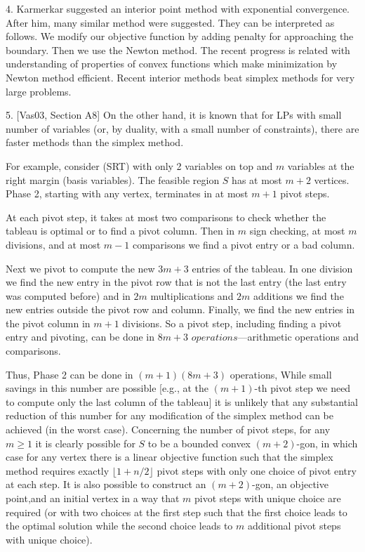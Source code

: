 4. Karmerkar suggested  an interior point  method   with exponential convergence.
After him, many similar method were suggested. They can be interpreted as follows.
We modify our objective function by adding penalty for approaching the boundary.
Then we use the Newton method. The recent progress is related with  understanding of   properties of convex functions which make minimization by Newton method efficient.
  Recent interior methods   beat simplex methods for very large problems. 

5. [Vas03, Section A8] On the other hand,  it is known that for LPs with small number of variables (or, by duality, with a small number of constraints), there are faster methods than the simplex method. 

For example, consider (SRT) with only 2 variables on top and
$m$ variables at the right margin (basis variables). 
The feasible region $S$ has at most  $m+2$ vertices. Phase 2, starting 
with any  vertex, terminates in at most $m +1$ pivot steps. 

At each pivot step, it takes at most two comparisons to check whether the
tableau is optimal or to find a pivot column. Then in $m$ sign checking,
at most  $m$ divisions, and  at most $m-1$ comparisons 
we find a pivot entry or a bad column. 

 Next we pivot to compute the new $3m + 3$ entries of the tableau.
In one division we find the
new entry in the pivot row that is not  the last entry (the last entry was computed before) and in $2m$ multiplications and $2m$ additions we find
the new entries outside the pivot row and column. Finally,
we find the new entries in the pivot column in 
 $m+1$ divisions. So a pivot step, including finding a pivot entry and pivoting,  can be done in $8m+3$  $operations$---arithmetic operations and comparisons. 

Thus, Phase 2 can be done in 
$(m+1)(8m+3)$
operations,  While  small savings
in this number are 
 possible  
  [e.g., at the $(m+1)$-th pivot step we need to compute only the 
last column of the tableau]  it is unlikely that any
substantial reduction of this number for any modification of  the simplex method
can be achieved (in the worst case).
Concerning the number of pivot steps,  for any $m \ge 1$ it is clearly possible for  $S$ to be a bounded convex  
$(m+2)$-gon, in which case  for any vertex there is a linear objective function such that the simplex method requires  exactly   $\lfloor 1+n/2 \rfloor$
pivot steps   with only one choice
of pivot entry at each  step. It is also possible to construct  an  $(m+2)$-gon,
an objective point,and an initial vertex in a way that  
$m$ pivot steps with unique choice  are required
(or with two choices at the first step
such that the first choice leads to the optimal solution while the second choice  leads to $m$ additional pivot steps with unique choice).

